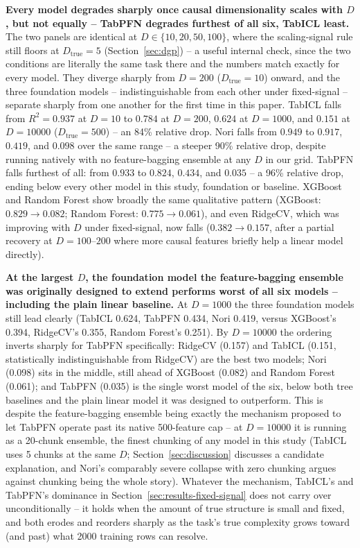 \documentclass{article}
\begin{document}
\textbf{Every model degrades sharply once causal dimensionality scales with $D$, but
not equally -- TabPFN degrades furthest of all six, TabICL least.} The two panels are
identical at $D \in \{10,20,50,100\}$, where the scaling-signal rule still floors at
$D_{\text{true}}=5$ (Section~\ref{sec:dgp}) -- a useful internal check, since the two
conditions are literally the same task there and the numbers match exactly for every
model. They diverge sharply from $D=200$ ($D_{\text{true}}=10$) onward, and the three
foundation models -- indistinguishable from each other under fixed-signal -- separate
sharply from one another for the first time in this paper. TabICL falls from
$R^2=0.937$ at $D=10$ to $0.784$ at $D=200$, $0.624$ at $D=1000$, and $0.151$ at
$D=10000$ ($D_{\text{true}}=500$) -- an 84\% relative drop. Nori falls from $0.949$ to
$0.917$, $0.419$, and $0.098$ over the same range -- a steeper 90\% relative drop,
despite running natively with no feature-bagging ensemble at any $D$ in our grid.
TabPFN falls furthest of all: from $0.933$ to $0.824$, $0.434$, and $0.035$ -- a 96\%
relative drop, ending below every other model in this study, foundation or baseline.
XGBoost and Random Forest show broadly the same qualitative pattern (XGBoost: $0.829
\to 0.082$; Random Forest: $0.775 \to 0.061$), and even RidgeCV, which was improving
with $D$ under fixed-signal, now falls ($0.382 \to 0.157$, after a partial recovery at
$D=100$--$200$ where more causal features briefly help a linear model directly).

\textbf{At the largest $D$, the foundation model the feature-bagging ensemble was
originally designed to extend performs worst of all six models -- including the plain
linear baseline.} At $D=1000$ the three foundation models still lead clearly (TabICL
0.624, TabPFN 0.434, Nori 0.419, versus XGBoost's 0.394, RidgeCV's 0.355, Random
Forest's 0.251). By $D=10000$ the ordering inverts sharply for TabPFN specifically:
RidgeCV (0.157) and TabICL (0.151, statistically indistinguishable from RidgeCV) are
the best two models; Nori (0.098) sits in the middle, still ahead of XGBoost (0.082)
and Random Forest (0.061); and TabPFN (0.035) is the single worst model of the six,
below both tree baselines and the plain linear model it was designed to outperform.
This is despite the feature-bagging ensemble \citep{feuer2023scaling} being exactly
the mechanism proposed to let TabPFN operate past its native 500-feature cap -- at
$D=10000$ it is running as a 20-chunk ensemble, the finest chunking of any model in
this study (TabICL uses 5 chunks at the same $D$; Section~\ref{sec:discussion}
discusses a candidate explanation, and Nori's comparably severe collapse with zero
chunking argues against chunking being the whole story). Whatever the mechanism,
TabICL's and TabPFN's dominance in Section~\ref{sec:results-fixed-signal} does not
carry over unconditionally -- it holds when the amount of true structure is small and
fixed, and both erodes and reorders sharply as the task's true complexity grows toward
(and past) what 2000 training rows can resolve.
\end{document}
